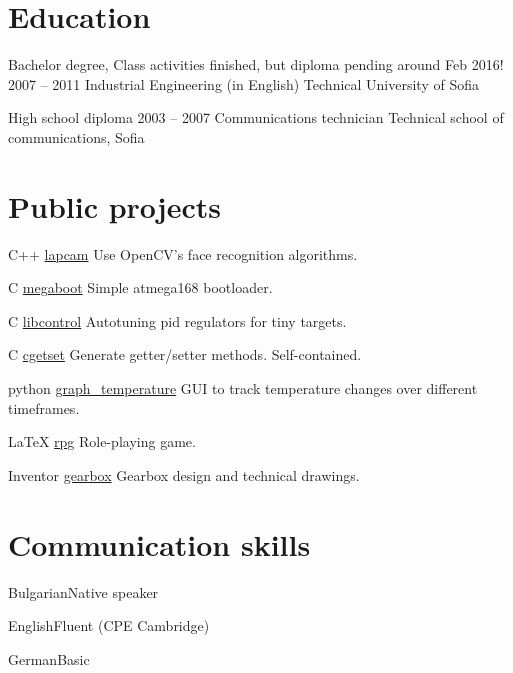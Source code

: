 \documentclass{tccv}
\begin{document}
\section{Education}
\begin{yearlist}
\item[Bachelor degree, \small \textsf{Class activities finished, but diploma pending around Feb 2016!}]{2007 -- 2011}
     {Industrial Engineering (in English)}
     {Technical University of Sofia}

\item[High school diploma]{2003 -- 2007}
     {Communications technician}
     {Technical school of communications, Sofia}
\end{yearlist}


\section{Public projects}
\begin{yearlist}
\item{C++}
     {\href{https://github.com/MiroslavVitkov/lapcam}{lapcam}}
     {Use OpenCV's face recognition algorithms.}

\item{C}
     {\href{https://github.com/MiroslavVitkov/megaboot}{megaboot}}
     {Simple atmega168 bootloader.}

\item{C}
     {\href{https://github.com/MiroslavVitkov/libcontrol}{libcontrol}}
     {Autotuning pid regulators for tiny targets.}

\item{C}
     {\href{https://github.com/MiroslavVitkov/cgetset}{cgetset}}
     {Generate getter/setter methods. Self-contained.}

\item{python}
     {\href{https://github.com/MiroslavVitkov/graph_temperature}{graph\_temperature}}
     {GUI to track temperature changes over different timeframes.}

\item{LaTeX}
     {\href{https://github.com/MiroslavVitkov/rpg}{rpg}}
     {Role-playing game.}

\item{Inventor}
     {\href{https://github.com/MiroslavVitkov/gearbox}{gearbox}}
     {Gearbox design and technical drawings.}
\end{yearlist}


\section{Communication skills}
\begin{factlist}
\item{Bulgarian}{Native speaker}
\item{English}{Fluent (CPE Cambridge)}
\item{German}{Basic}
\end{factlist}
\end{document}
